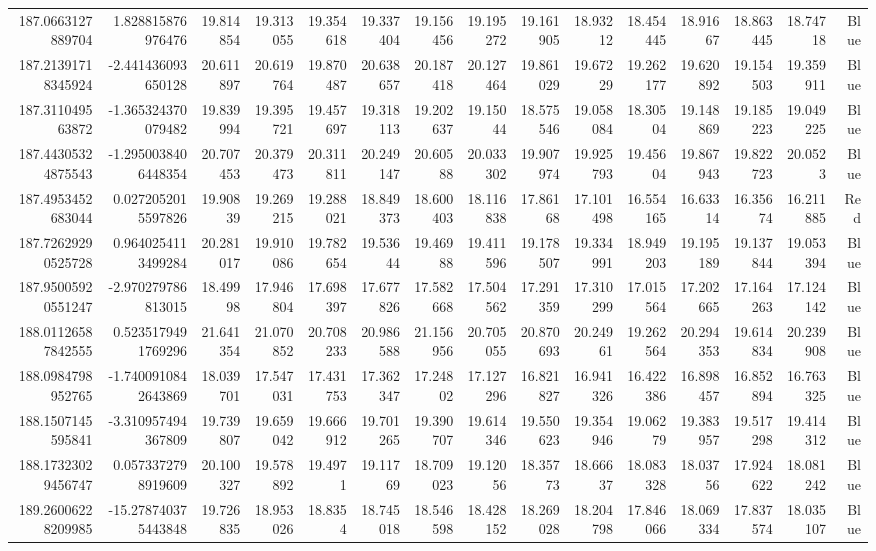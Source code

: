 \begin{center}
\begin{longtable}{rrrrrrrrrrrrrrr}
187.0663127889704 & 1.828815876976476 & 19.814854 & 19.313055 & 19.354618 & 19.337404 & 19.156456 & 19.195272 & 19.161905 & 18.93212 & 18.454445 & 18.91667 & 18.863445 & 18.74718 & Blue \\
187.21391718345924 & -2.441436093650128 & 20.611897 & 20.619764 & 19.870487 & 20.638657 & 20.187418 & 20.127464 & 19.861029 & 19.67229 & 19.262177 & 19.620892 & 19.154503 & 19.359911 & Blue \\
187.311049563872 & -1.365324370079482 & 19.839994 & 19.395721 & 19.457697 & 19.318113 & 19.202637 & 19.15044 & 18.575546 & 19.058084 & 18.30504 & 19.148869 & 19.185223 & 19.049225 & Blue \\
187.44305324875543 & -1.2950038406448354 & 20.707453 & 20.379473 & 20.311811 & 20.249147 & 20.60588 & 20.033302 & 19.907974 & 19.925793 & 19.45604 & 19.867943 & 19.822723 & 20.0523 & Blue \\
187.4953452683044 & 0.0272052015597826 & 19.90839 & 19.269215 & 19.288021 & 18.849373 & 18.600403 & 18.116838 & 17.86168 & 17.101498 & 16.554165 & 16.63314 & 16.35674 & 16.211885 & Red \\
187.72629290525728 & 0.9640254113499284 & 20.281017 & 19.910086 & 19.782654 & 19.53644 & 19.46988 & 19.411596 & 19.178507 & 19.334991 & 18.949203 & 19.195189 & 19.137844 & 19.053394 & Blue \\
187.95005920551247 & -2.970279786813015 & 18.49998 & 17.946804 & 17.698397 & 17.677826 & 17.582668 & 17.504562 & 17.291359 & 17.310299 & 17.015564 & 17.202665 & 17.164263 & 17.124142 & Blue \\
188.01126587842555 & 0.5235179491769296 & 21.641354 & 21.070852 & 20.708233 & 20.986588 & 21.156956 & 20.705055 & 20.870693 & 20.24961 & 19.262564 & 20.294353 & 19.614834 & 20.239908 & Blue \\
188.0984798952765 & -1.7400910842643869 & 18.039701 & 17.547031 & 17.431753 & 17.362347 & 17.24802 & 17.127296 & 16.821827 & 16.941326 & 16.422386 & 16.898457 & 16.852894 & 16.763325 & Blue \\
188.1507145595841 & -3.310957494367809 & 19.739807 & 19.659042 & 19.666912 & 19.701265 & 19.390707 & 19.614346 & 19.550623 & 19.354946 & 19.06279 & 19.383957 & 19.517298 & 19.414312 & Blue \\
188.17323029456747 & 0.0573372798919609 & 20.100327 & 19.578892 & 19.4971 & 19.11769 & 18.709023 & 19.12056 & 18.35773 & 18.66637 & 18.083328 & 18.03756 & 17.924622 & 18.081242 & Blue \\
189.26006228209985 & -15.278740375443848 & 19.726835 & 18.953026 & 18.8354 & 18.745018 & 18.546598 & 18.428152 & 18.269028 & 18.204798 & 17.846066 & 18.069334 & 17.837574 & 18.035107 & Blue \\

\end{longtable}
\end{center}
